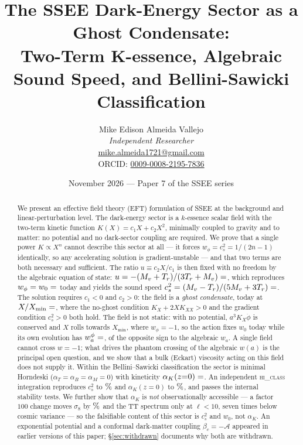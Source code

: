 \documentclass[12pt,a4paper]{article}
\title{\textbf{The SSEE Dark-Energy Sector as a Ghost Condensate:\\
       Two-Term K-essence, Algebraic Sound Speed, and Bellini-Sawicki
       Classification}}
\author{Mike Edison Almeida Vallejo \\
\small \textit{Independent Researcher} \\
\small \href{mailto:mike.almeida1721@gmail.com}{mike.almeida1721@gmail.com} \\
\small ORCID: \href{https://orcid.org/0009-0008-2195-7836}{0009-0008-2195-7836}
}
\date{November 2026 --- Paper 7 of the SSEE series}
\newcommand{\AURA}{\mathcal{A}}
\newcommand{\bc}{\beta_c}
\begin{document}
\maketitle

\begin{abstract}
We present an effective field theory (EFT) formulation of SSEE at the
background and linear-perturbation level.
The dark-energy sector is a $k$-essence scalar field with the two-term
kinetic function $K(X) = c_1 X + c_2 X^2$, minimally coupled to gravity
and to matter: no potential and no dark-sector coupling are required.
We prove that a single power $K \propto X^n$ cannot describe this sector
at all --- it forces $w_\phi = c_s^2 = 1/(2n-1)$ identically, so any
accelerating solution is gradient-unstable --- and that two terms are
both necessary and sufficient.
The ratio $u \equiv c_2 X/c_1$ is then fixed with no freedom by the
algebraic equation of state: $u = -(M_v+T_r)/(3T_r+M_v) = \val{u_condensado_d6}$,
which reproduces $w_\phi = w_0 = \val{W0_d6}$ today and yields the
sound speed $c_s^2 = (M_v-T_r)/(5M_v+3T_r) = \val{cs2_condensado_d6}$.
The solution requires $c_1 < 0$ and $c_2 > 0$: the field is a
\emph{ghost condensate}, today at $X/X_{\min} = \val{X_sobre_Xmin_d6}$, where
the no-ghost condition $K_X + 2XK_{XX} > 0$ and the gradient condition
$c_s^2 > 0$ both hold.
The field is not static: with no potential, $a^3K_X\dot\phi$ is conserved and $X$
rolls towards $X_{\min}$, where $w_\phi=-1$, so the action fixes $w_0$ today while
its own evolution has $w_a^\phi = \val{p7_wa_campo}$, of the opposite sign to the
algebraic $w_a$. A single field cannot cross $w=-1$; what drives the phantom
crossing of the algebraic $w(a)$ is the principal open question, and we show that
a bulk (Eckart) viscosity acting on this field does not supply it.
Within the Bellini--Sawicki classification the sector is minimal Horndeski
($\alpha_T = \alpha_B = \alpha_M = 0$) with kineticity
$\alpha_K(z{=}0) = \val{alpha_K_z0_d6}$.
An independent \textsc{hi\_class} integration reproduces $c_s^2$ to $\val{p7_hc_cs2_pct}\%$
and $\alpha_K(z{=}0)$ to $\val{p7_hc_alphaK_pct}\%$, and passes the internal stability
tests.
We further show that $\alpha_K$ is \emph{not} observationally accessible ---
a factor $100$ change moves $\sigma_8$ by $\val{p7_hc_s8_xk_pct}\%$ and the TT spectrum only
at $\ell < 10$, seven times below cosmic variance --- so the falsifiable
content of this sector is $c_s^2$ and $w_0$, not $\alpha_K$.
An exponential potential and a conformal dark-matter coupling
$\bc = -\AURA$ appeared in earlier versions of this paper; §\ref{sec:withdrawn}
documents why both are withdrawn.
\end{abstract}
\end{document}

